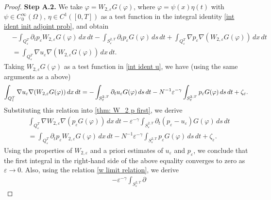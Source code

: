 \documentclass[10pt,a4paper]{amsart}
\numberwithin{equation}{section}
\begin{document}
\begin{proof}
\noindent\textbf{Step A.2.} 
We take $\varphi =W_{2,\varepsilon }G(\varphi )$, where 
$\varphi =\psi (x)\eta (t)$ with $\psi \in C_0^{\infty }(\Omega )$, 
$\eta\in C^{1}([0,T])$ as a test function in the integral identity
\eqref{int ident init adjoint prob}, and obtain
\begin{equation}
\begin{aligned}
&-\int _{Q_{\varepsilon }^{T}}\partial _{t}p_{\varepsilon
}W_{2,\varepsilon }G(\varphi )\,dx\,dt-\int _{S_{\varepsilon
}^{2,T}}\partial _{t}p_{\varepsilon }G(\varphi )\,ds\,dt
+\int _{Q_{\varepsilon }^{T}}\nabla p_{\varepsilon }\nabla (W_{2,
\varepsilon }G(\varphi ))\,dx\,dt    \\
&=\int _{Q_{\varepsilon }^{T}}\nabla u_{\varepsilon }\nabla
(W_{2,\varepsilon }G(\varphi ))\,dx\,dt.
\end{aligned}  \label{thm: W_2 p first}
\end{equation}
Taking $W_{2,\varepsilon }G(\varphi )$ as a test function in
\eqref{int ident u}, we have (using the same arguments as a above)
\[
\int _{Q_{\varepsilon }^{T}}\nabla u_{\varepsilon }\nabla
(W_{2,\varepsilon }G(\varphi ))\,dx\,dt=-\int _{S_{\varepsilon
}^{2,T}}\partial _{t}u_{\varepsilon }G(\varphi )\,ds\,dt-N^{-1}\varepsilon
^{-\gamma }\int _{S_{\varepsilon }^{2,T}}p_{\varepsilon }G(\varphi ){%
\,ds\,dt}+\zeta _{\varepsilon }.
\]%
Substituting this relation into \eqref{thm: W_2 p first}, we derive
\begin{equation}
\begin{aligned}
&\int _{Q_{\varepsilon }^{T}}\nabla W_{2,\varepsilon }\nabla
(p_{\varepsilon }G(\varphi ))\,dx\,dt-\varepsilon ^{-\gamma
}\int _{S_{\varepsilon }^{2,T}}\partial _{t}(p_{\varepsilon
}-u_{\varepsilon })G(\varphi )\,ds\,dt    \\
&=\int _{Q_{\varepsilon }^{T}}\partial _{t}p_{\varepsilon
}W_{2,\varepsilon }G(\varphi )\,dx\,dt-N^{-1}\varepsilon ^{-\gamma
}\int _{S_{\varepsilon }^{2,T}}p_{\varepsilon }G(\varphi )\,ds\,dt+\zeta
_{\varepsilon }.
\end{aligned}  \label{thm: p ident G}
\end{equation}
Using the properties of $W_{2,\varepsilon }$ and a priori estimates of
$u_{\varepsilon }$ and $p_{\varepsilon }$, we conclude that the first
integral in the right-hand side of the above equality converges to zero as
$\varepsilon \to 0$. Also, using the relation \eqref{w limit relation}, we derive
\begin{equation}
\begin{aligned}
&-\varepsilon ^{-\gamma }\int _{S_{\varepsilon }^{2,T}}\partial

\end{aligned}
\end{equation}
\end{proof}
\end{document}
